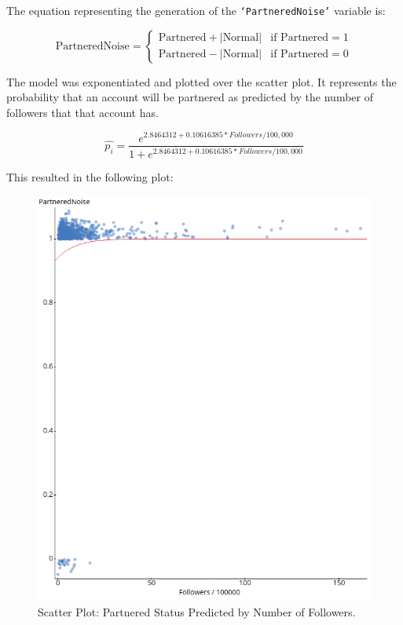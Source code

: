 \documentclass[12pt]{article}
\begin{document}
\noindent The equation representing the generation of the \texttt{`PartneredNoise'} variable is:

\begin{equation}
\text{PartneredNoise} = 
\begin{cases}
    \text{Partnered} + \lvert \text{Normal} \rvert & \text{if } \text{Partnered} = 1 \\
    \text{Partnered} - \lvert \text{Normal} \rvert & \text{if } \text{Partnered} = 0
\end{cases}
\end{equation}

\noindent The model was exponentiated and plotted over the scatter plot. It represents the probability that an account will be partnered as predicted by the number of followers that that account has.

\begin{equation}
\hat{p_{i}} = \frac{e^{2.8464312 + 0.10616385 \ast Followers/100,000}}{1 + e^{2.8464312 + 0.10616385 \ast Followers/100,000}}
\end{equation}

This resulted in the following plot:

\begin{figure}[H]
\centering
	\includegraphics[height=0.55\textheight]{../StatCrunch_Results/logit_partnered_followers/scatter_plot}
	\captionsetup{justification=centering, singlelinecheck=false, margin=2cm}
	\caption[Scatter Plot: Partnered Status Predicted by Number of Followers]{Scatter Plot: Partnered Status Predicted by Number of Followers.}
	\label{fig:logit_partnered_followers}
\end{figure}
\end{document}
